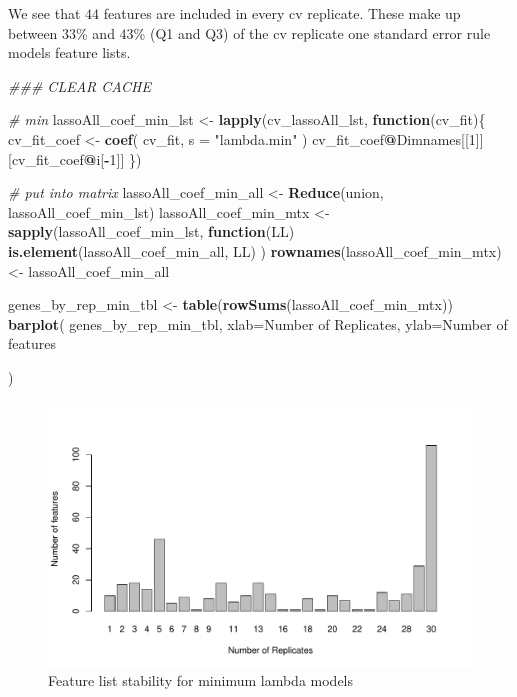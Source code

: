 \documentclass[
]{book}
\newenvironment{Shaded}{\begin{snugshade}}{\end{snugshade}}
\newcommand{\CommentTok}[1]{\textcolor[rgb]{0.56,0.35,0.01}{\textit{#1}}}
\newcommand{\ControlFlowTok}[1]{\textcolor[rgb]{0.13,0.29,0.53}{\textbf{#1}}}
\newcommand{\DataTypeTok}[1]{\textcolor[rgb]{0.13,0.29,0.53}{#1}}
\newcommand{\DecValTok}[1]{\textcolor[rgb]{0.00,0.00,0.81}{#1}}
\newcommand{\KeywordTok}[1]{\textcolor[rgb]{0.13,0.29,0.53}{\textbf{#1}}}
\newcommand{\NormalTok}[1]{#1}
\newcommand{\OperatorTok}[1]{\textcolor[rgb]{0.81,0.36,0.00}{\textbf{#1}}}
\newcommand{\StringTok}[1]{\textcolor[rgb]{0.31,0.60,0.02}{#1}}
\begin{document}
We see that \(44\) features are included in every
cv replicate. These make up between
\(33\)\%
and
\(43\)\%
(Q1 and Q3) of the cv replicate one standard error rule models feature lists.

\begin{Shaded}
\begin{Highlighting}[]
\CommentTok{\#\#\# CLEAR CACHE}


\CommentTok{\# min}
\NormalTok{lassoAll\_coef\_min\_lst <{-}}\StringTok{ }\KeywordTok{lapply}\NormalTok{(cv\_lassoAll\_lst, }\ControlFlowTok{function}\NormalTok{(cv\_fit)\{}
\NormalTok{ cv\_fit\_coef <{-}}\StringTok{ }\KeywordTok{coef}\NormalTok{(}
\NormalTok{ cv\_fit,}
 \DataTypeTok{s =} \StringTok{"lambda.min"}
\NormalTok{ )}
\NormalTok{ cv\_fit\_coef}\OperatorTok{@}\NormalTok{Dimnames[[}\DecValTok{1}\NormalTok{]][cv\_fit\_coef}\OperatorTok{@}\NormalTok{i[}\OperatorTok{{-}}\DecValTok{1}\NormalTok{]]}
\NormalTok{ \})}

\CommentTok{\# put into matrix}
\NormalTok{lassoAll\_coef\_min\_all <{-}}\StringTok{ }\KeywordTok{Reduce}\NormalTok{(union, lassoAll\_coef\_min\_lst)}
\NormalTok{lassoAll\_coef\_min\_mtx <{-}}\StringTok{ }\KeywordTok{sapply}\NormalTok{(lassoAll\_coef\_min\_lst, }
  \ControlFlowTok{function}\NormalTok{(LL) }\KeywordTok{is.element}\NormalTok{(lassoAll\_coef\_min\_all, LL)}
\NormalTok{)}
\KeywordTok{rownames}\NormalTok{(lassoAll\_coef\_min\_mtx) <{-}}\StringTok{ }\NormalTok{lassoAll\_coef\_min\_all}

\NormalTok{genes\_by\_rep\_min\_tbl <{-}}\StringTok{ }\KeywordTok{table}\NormalTok{(}\KeywordTok{rowSums}\NormalTok{(lassoAll\_coef\_min\_mtx))}
\KeywordTok{barplot}\NormalTok{(}
\NormalTok{ genes\_by\_rep\_min\_tbl,}
 \DataTypeTok{xlab=}\StringTok{\textquotesingle{}Number of Replicates\textquotesingle{}}\NormalTok{,}
 \DataTypeTok{ylab=}\StringTok{\textquotesingle{}Number of features\textquotesingle{}}

\NormalTok{)}
\end{Highlighting}
\end{Shaded}

\begin{figure}
\centering
\includegraphics{Static/figures/feature-list-min-1.pdf}
\caption{\label{fig:feature-list-min}Feature list stability for minimum lambda models}
\end{figure}
\end{document}
